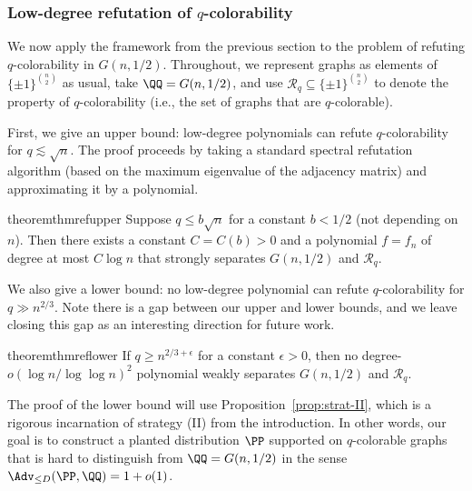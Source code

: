 \documentclass{article}
\begin{document}
\subsubsection{Low-degree refutation of $q$-colorability}


We now apply the framework from the previous section to the problem of refuting $q$-colorability in $G(n,1/2)$. Throughout, we represent graphs as elements of $\{\pm 1\}^{\binom{n}{2}}$ as usual, take $\QQ = G(n,1/2)$, and use $\mathcal{R}_q \subseteq \{\pm 1\}^{\binom{n}{2}}$ to denote the property of $q$-colorability (i.e., the set of graphs that are $q$-colorable).

First, we give an upper bound: low-degree polynomials can refute $q$-colorability for $q \lesssim \sqrt{n}$. The proof proceeds by taking a standard spectral refutation algorithm (based on the maximum eigenvalue of the adjacency matrix) and approximating it by a polynomial.

\begin{restatable}{theorem}{thmrefupper}
\label{thm:ref-upper}
Suppose $q \le b \sqrt{n}$ for a constant $b < 1/2$ (not depending on $n$). Then there exists a constant $C = C(b) > 0$ and a polynomial $f = f_n$ of degree at most $C \log n$ that strongly separates $G(n,1/2)$ and $\mathcal{R}_q$.
\end{restatable}


\noindent We also give a lower bound: no low-degree polynomial can refute $q$-colorability for $q \gg n^{2/3}$. Note there is a gap between our upper and lower bounds, and we leave closing this gap as an interesting direction for future work.


\begin{restatable}{theorem}{thmreflower}\label{thm:ref-lower}
If $q \ge n^{2/3 + \epsilon}$ for a constant $\epsilon > 0$, then no degree-$o(\log n/\log\log n)^2$ polynomial weakly separates $G(n,1/2)$ and $\mathcal{R}_q$.
\end{restatable}


\noindent The proof of the lower bound will use Proposition~\ref{prop:strat-II}, which is a rigorous incarnation of strategy (II) from the introduction. In other words, our goal is to construct a planted distribution $\PP$ supported on $q$-colorable graphs that is hard to distinguish from $\QQ = G(n,1/2)$ in the sense $\Adv_{\le D}(\PP,\QQ) = 1+o(1)$.
\end{document}
